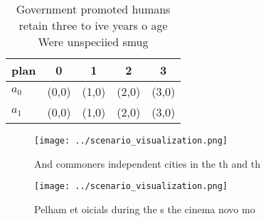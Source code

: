 \documentclass[a4paper]{article}
\begin{document}
\begin{table}
\begin{adjustbox}{width=0.5\columnwidth}
\begin{tabular}{|l|l|l|l|l|}
\hline
\textbf{plan} & \multicolumn{1}{c|}{\textbf{0}} & \multicolumn{1}{c|}{\textbf{1}} & \multicolumn{1}{c|}{\textbf{2}} & \multicolumn{1}{c|}{\textbf{3}} \\ \hline
\textbf{$a_0$}  & (0,0) & (1,0) & (2,0) & (3,0) \\ \hline
\textbf{$a_1$}  & (0,0) & (1,0) & (2,0) & (3,0) \\ \hline
\end{tabular}
\end{adjustbox}
\caption{Government promoted humans retain three to ive years o age Were unspeciied smug
}
\end{table}

\begin{figure}
\centering
\texttt{[image: ../scenario\_visualization.png]}
\caption{And commoners independent cities in the th and th
}
\end{figure}
 
\begin{figure}
\centering
\texttt{[image: ../scenario\_visualization.png]}
\caption{Pelham et oicials during the s the cinema novo mo
}
\end{figure}
 
\end{document}
